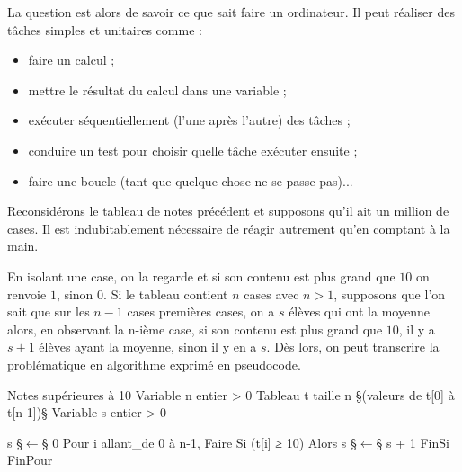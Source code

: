 %
La question est alors de savoir ce que sait faire un ordinateur. Il peut réaliser des tâches simples et unitaires comme :
\begin{itemize}
\item faire un calcul ;
\item mettre le résultat du calcul dans une variable ;
\item exécuter séquentiellement (l'une après l'autre) des tâches ;
\item conduire un test pour choisir quelle tâche exécuter ensuite ;
\item faire une boucle (tant que quelque chose ne se passe pas)...
\end{itemize}

Reconsidérons le tableau de notes précédent et supposons qu'il ait un million de cases. Il est indubitablement nécessaire de réagir autrement qu'en comptant à la main. 

En isolant une case, on la regarde et si son contenu est plus grand que $10$ on renvoie $1$, sinon $0$. Si le tableau contient $n$ cases avec $n > 1$, supposons que l'on sait que sur les $n-1$ cases premières cases, on a $s$ élèves qui ont la moyenne alors, en observant la n-ième case, si son contenu est plus grand que $10$, il y a $s+1$ élèves ayant la moyenne, sinon il y en a $s$. Dès lors, on peut transcrire la problématique en algorithme exprimé en pseudocode.

\begin{algorithm}{Notes supérieures à 10}
Variable n entier > 0
Tableau  t taille n §(valeurs de t[0] à t[n-1])§
Variable s entier > 0

s §$\leftarrow$§ 0
Pour i allant_de 0 à n-1, Faire
  Si (t[i] ≥ 10)
    Alors s §$\leftarrow$§ s + 1
  FinSi
FinPour
\end{algorithm}

